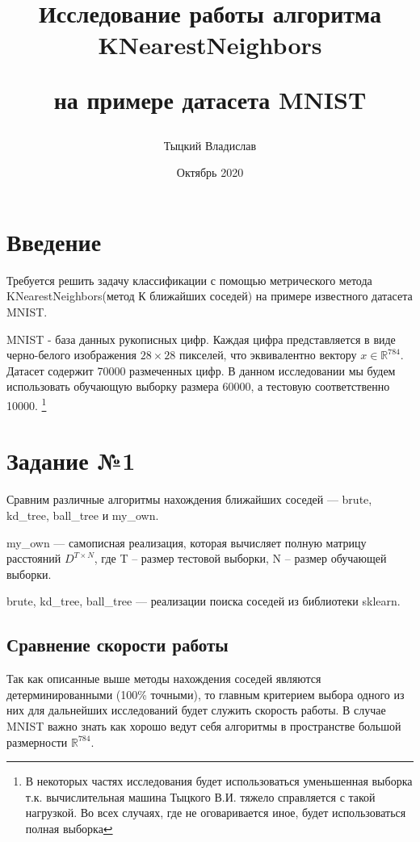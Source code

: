 \documentclass[12pt,fleqn]{article}
\title{Исследование работы алгоритма KNearestNeighbors 

на примере датасета MNIST}
\author{Тыцкий Владислав}
\date{Октябрь 2020}
\begin{document}
\maketitle

\section{Введение}
Требуется решить задачу классификации с помощью метрического метода KNearestNeighbors(метод К ближайших соседей)
 на примере известного датасета  MNIST.
 
 MNIST - база данных рукописных цифр. Каждая цифра представляется в виде  черно-белого изображения  $28\times28$ пикселей,
  что эквивалентно вектору 
 $x \in \mathbb{R}^{784}$. Датасет содержит 70000 размеченных цифр. В данном исследовании мы будем использовать 
 обучающую выборку размера 60000, а тестовую соответственно 10000.
 \footnote{В некоторых частях исследования будет использоваться уменьшенная выборка т.к. вычислительная 
 машина Тыцкого В.И. тяжело справляется с такой нагрузкой. Во всех случаях, где не оговаривается иное,
 будет использоваться полная выборка}

\section{Задание №1}
Сравним различные алгоритмы нахождения ближайших соседей --- brute, kd\_tree, ball\_tree и my\_own. 

my\_own --- самописная реализация, которая вычисляет полную матрицу расстояний $D^{T \times N}$, где T -- размер 
тестовой выборки, N -- размер обучающей выборки.

brute, kd\_tree, ball\_tree --- реализации поиска соседей из библиотеки sklearn.
\subsection{Сравнение скорости работы}
Так как описанные выше методы нахождения соседей являются детерминированными (100\% точными), то главным критерием 
выбора одного из них для дальнейших исследований будет служить скорость работы.
В случае MNIST важно знать как хорошо ведут себя алгоритмы в пространстве большой размерности $\mathbb{R}^{784}$. 
\end{document}
